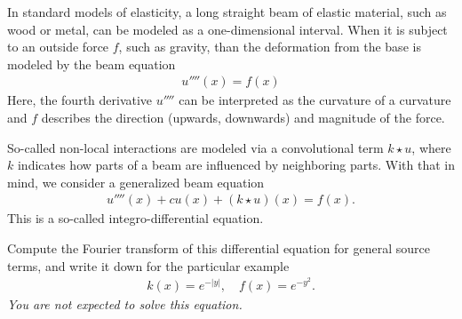 \documentclass[11pt]{article}
\begin{document}
\begin{exercise}
    In standard models of elasticity, a long straight beam of elastic material, such as wood or metal, can be modeled as a one-dimensional interval. 
    When it is subject to an outside force $f$, such as gravity, than the deformation from the base is modeled by the beam equation 
    \begin{align}
        u''''(x) = f(x)
    \end{align}
    Here, the fourth derivative $u''''$ can be interpreted as the curvature of a curvature and $f$ describes the direction (upwards, downwards) and magnitude of the force.
    
    So-called non-local interactions are modeled via a convolutional term $k \star u$, where $k$ indicates how parts of a beam are influenced by neighboring parts.
    With that in mind, we consider a generalized beam equation 
    \begin{align}
        u''''(x) + c u(x) + ( k \star u )(x) = f(x)
        .
    \end{align}
    This is a so-called integro-differential equation. 
    
    Compute the Fourier transform of this differential equation for general source terms,
    and write it down for the particular example
    \begin{align}
        k(x) = e^{-|y|},
        \quad 
        f(x) = e^{-y^{2}}.
    \end{align}
    \textit{You are not expected to solve this equation.}
\end{exercise}
\end{document}
